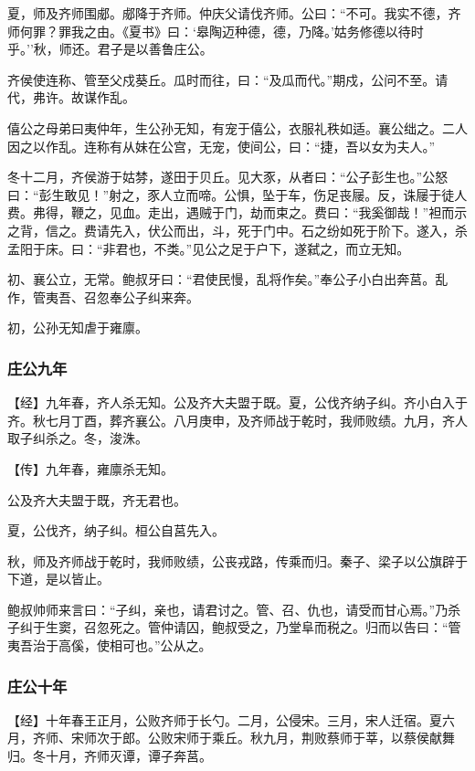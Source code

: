 \documentclass[]{article}
\begin{document}
夏，师及齐师围郕。郕降于齐师。仲庆父请伐齐师。公曰：``不可。我实不德，齐师何罪？罪我之由。《夏书》曰：`皋陶迈种德，德，乃降。'姑务修德以待时乎。''秋，师还。君子是以善鲁庄公。

齐侯使连称、管至父戍葵丘。瓜时而往，曰：``及瓜而代。''期戍，公问不至。请代，弗许。故谋作乱。

僖公之母弟曰夷仲年，生公孙无知，有宠于僖公，衣服礼秩如适。襄公绌之。二人因之以作乱。连称有从妹在公宫，无宠，使间公，曰：``捷，吾以女为夫人。''

冬十二月，齐侯游于姑棼，遂田于贝丘。见大豕，从者曰：``公子彭生也。''公怒曰：``彭生敢见！''射之，豕人立而啼。公惧，坠于车，伤足丧屦。反，诛屦于徒人费。弗得，鞭之，见血。走出，遇贼于门，劫而束之。费曰：``我奚御哉！''袒而示之背，信之。费请先入，伏公而出，斗，死于门中。石之纷如死于阶下。遂入，杀孟阳于床。曰：``非君也，不类。''见公之足于户下，遂弑之，而立无知。

初、襄公立，无常。鲍叔牙曰：``君使民慢，乱将作矣。''奉公子小白出奔莒。乱作，管夷吾、召忽奉公子纠来奔。

初，公孙无知虐于雍廪。

\hypertarget{header-n414}{%
\subsubsection{庄公九年}\label{header-n414}}

【经】九年春，齐人杀无知。公及齐大夫盟于既。夏，公伐齐纳子纠。齐小白入于齐。秋七月丁酉，葬齐襄公。八月庚申，及齐师战于乾时，我师败绩。九月，齐人取子纠杀之。冬，浚洙。

【传】九年春，雍廪杀无知。

公及齐大夫盟于既，齐无君也。

夏，公伐齐，纳子纠。桓公自莒先入。

秋，师及齐师战于乾时，我师败绩，公丧戎路，传乘而归。秦子、梁子以公旗辟于下道，是以皆止。

鲍叔帅师来言曰：``子纠，亲也，请君讨之。管、召、仇也，请受而甘心焉。''乃杀子纠于生窦，召忽死之。管仲请囚，鲍叔受之，乃堂阜而税之。归而以告曰：``管夷吾治于高傒，使相可也。''公从之。

\hypertarget{header-n423}{%
\subsubsection{庄公十年}\label{header-n423}}

【经】十年春王正月，公败齐师于长勺。二月，公侵宋。三月，宋人迁宿。夏六月，齐师、宋师次于郎。公败宋师于乘丘。秋九月，荆败蔡师于莘，以蔡侯献舞归。冬十月，齐师灭谭，谭子奔莒。
\end{document}

